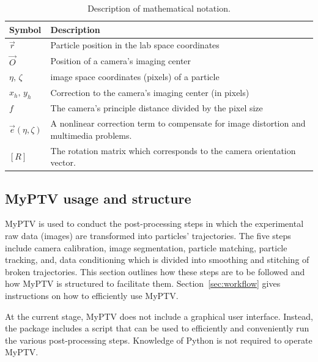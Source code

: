 \documentclass[10pt,a4paper]{article}
\begin{document}
\begin{table}[!ht]
	\centering
	\caption{Description of mathematical notation. \label{tab1:mathdesc}}
	\begin{tabular}{p{5em} p{30em}}
		\hline
		Symbol & Description \\ \hline
		$\vec{r}$ & Particle position in the lab space coordinates\\
		$\vec{O} $& Position of a camera's imaging center \\
		$\eta, \, \zeta$ & image space coordinates (pixels) of a particle \\
		$x_h , \, y_h$ & Correction to the camera's imaging center (in pixels)\\
		$f$ & The camera's principle distance divided by the pixel size \\ 
		$\vec{e}(\eta, \zeta)$ & A nonlinear correction term to compensate for image distortion and multimedia problems.\\
		$[R]$ & The rotation matrix which corresponds to the camera orientation vector. \\  \hline
	\end{tabular}
\end{table}















\subsection{MyPTV usage and structure}


MyPTV is used to conduct the post-processing steps in which the experimental raw data (images) are transformed into particles' trajectories. The five steps include camera calibration, image segmentation, particle matching, particle tracking, and, data conditioning which is divided into smoothing and stitching of broken trajectories. This section outlines how these steps are to be followed and how MyPTV is structured to facilitate them. Section~\ref{sec:workflow} gives instructions on how to efficiently use MyPTV. 


At the current stage, MyPTV does not include a graphical user interface. Instead, the package includes a script that can be used to efficiently and conveniently run the various post-processing steps. Knowledge of Python is not required to operate MyPTV.
\end{document}

